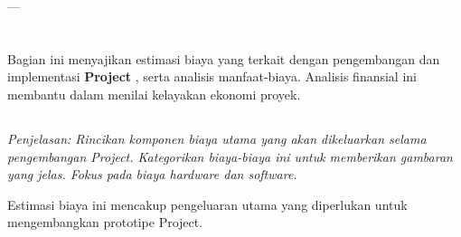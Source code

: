 \documentclass{elsinta}
\begin{document}
---

\section{\FinancialAnalysisTitle}

Bagian ini menyajikan estimasi biaya yang terkait dengan pengembangan dan implementasi \textbf{Project }, serta analisis manfaat-biaya. Analisis finansial ini membantu dalam menilai kelayakan ekonomi proyek.

\subsection{\CostEstimationTitle}
\textit{Penjelasan: Rincikan komponen biaya utama yang akan dikeluarkan selama pengembangan Project. Kategorikan biaya-biaya ini untuk memberikan gambaran yang jelas. Fokus pada biaya hardware dan software.}

Estimasi biaya ini mencakup pengeluaran utama yang diperlukan untuk mengembangkan prototipe Project.
\end{document}
